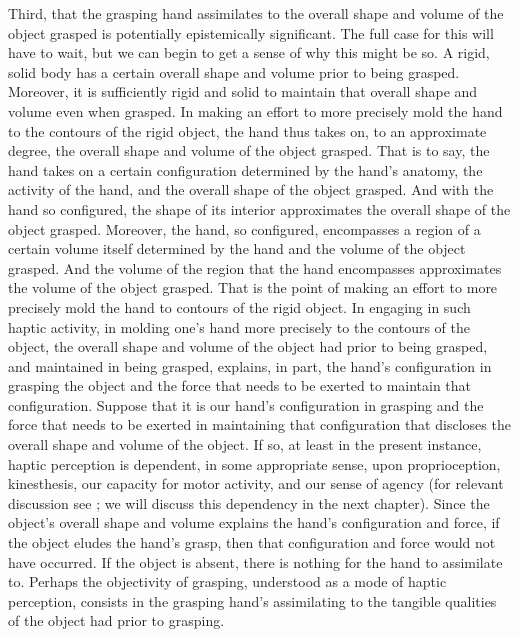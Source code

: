Third, that the grasping hand assimilates to the overall shape and volume of the object grasped is potentially epistemically significant. The full case for this will have to wait, but we can begin to get a sense of why this might be so. A rigid, solid body has a certain overall shape and volume prior to being grasped. Moreover, it is sufficiently rigid and solid to maintain that overall shape and volume even when grasped. In making an effort to more precisely mold the hand to the contours of the rigid object, the hand thus takes on, to an approximate degree, the overall shape and volume of the object grasped. That is to say, the hand takes on a certain configuration determined by the hand's anatomy, the activity of the hand, and the overall shape of the object grasped. And with the hand so configured, the shape of its interior approximates the overall shape of the object grasped. Moreover, the hand, so configured, encompasses a region of a certain volume itself determined by the hand and the volume of the object grasped. And the volume of the region that the hand encompasses approximates the volume of the object grasped. That is the point of making an effort to more precisely mold the hand to contours of the rigid object. In engaging in such haptic activity, in molding one's hand more precisely to the contours of the object, the overall shape and volume of the object had prior to being grasped, and maintained in being grasped, explains, in part, the hand's configuration in grasping the object and the force that needs to be exerted to maintain that configuration. Suppose that it is our hand's configuration in grasping and the force that needs to be exerted in maintaining that configuration that discloses the overall shape and volume of the object. If so, at least in the present instance, haptic perception is dependent, in some appropriate sense, upon proprioception, kinesthesis, our capacity for motor activity, and our sense of agency (for relevant discussion see \citealt{OShaughnessy:1989zp,OShaughnessy:1995ty,Martin:1992aa,Fulkerson:2014ek}; we will discuss this dependency in the next chapter). Since the object's overall shape and volume explains the hand's configuration and force, if the object eludes the hand's grasp, then that configuration and force would not have occurred. If the object is absent, there is nothing for the hand to assimilate to. Perhaps the objectivity of grasping, understood as a mode of haptic perception, consists in the grasping hand's assimilating to the tangible qualities of the object had prior to grasping.

